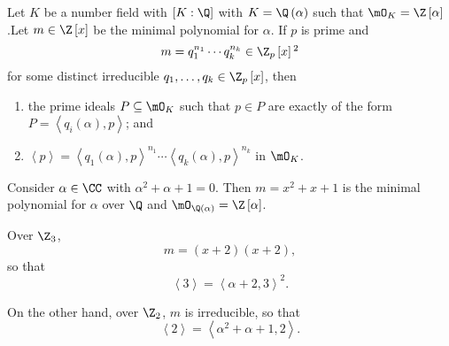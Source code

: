 \documentclass[pmath441]{subfiles}
\begin{document}
    \begin{prop}{}
        Let $K$ be a number field with $\left[ K:\Q \right]$ with $K=\Q\left( \alpha \right)$ such that $\mO_K=\Z\left[ \alpha \right]$.\footnotemark[1] Let $m\in\Z\left[ x \right]$ be the minimal polynomial for $\alpha$. If $p$ is prime and
        \begin{equation*}
            m = q_1^{n_1}\cdots q_k^{n_k}\in\Z_p\left[ x \right]\footnotemark[2]
        \end{equation*}
        for some distinct irreducible $q_1,\ldots,q_k\in\Z_p\left[ x \right]$, then
        \begin{enumerate}
            \item the prime ideals $P\subseteq\mO_K$ such that $p\in P$ are exactly of the form $P=\left< q_i\left( \alpha \right),p \right>$; and
            \item $\left< p \right> = \left< q_1\left( \alpha \right),p \right>^{n_1} \cdots \left< q_k\left( \alpha \right),p \right>^{n_k}$ in $\mO_K$.
        \end{enumerate}
        
        \noindent
        \begin{minipage}{\textwidth}
        \end{minipage}
    \end{prop}

    
    \begin{example}{}
        Consider $\alpha\in\CC$ with $\alpha^{2}+\alpha+1 = 0$. Then $m = x^{2}+x+1$ is the minimal polynomial for $\alpha$ over $\Q$ and $\mO_{\Q\left( \alpha \right)} = \Z\left[ \alpha \right]$.

        Over $\Z_3$,
        \begin{equation*}
            m = \left( x+2 \right)\left( x+2 \right),
        \end{equation*}
        so that
        \begin{equation*}
            \left< 3 \right> = \left< \alpha+2,3 \right>^{2}.  
        \end{equation*}

        On the other hand, over $\Z_2$, $m$ is irreducible, so that
        \begin{equation*}
            \left< 2 \right> = \left< \alpha^{2}+\alpha+1,2 \right>. 
        \end{equation*}
    \end{example}
\end{document}
